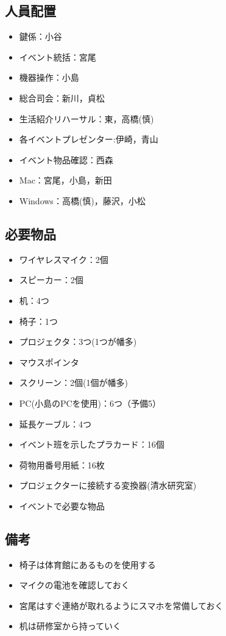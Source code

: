 \subsection{人員配置}
\begin{itemize}
\item 鍵係：小谷
\item イベント統括：宮尾
\item 機器操作：小島
\item 総合司会：新川，貞松
\item 生活紹介リハーサル：東，高橋(慎)
\item 各イベントプレゼンター:伊崎，青山
\item イベント物品確認：西森
\item Mac：宮尾，小島，新田
\item Windows：高橋(慎)，藤沢，小松
\end{itemize}




\subsection{必要物品}
\begin{itemize}
\item ワイヤレスマイク：2個
\item スピーカー：2個
\item 机：4つ
\item 椅子：1つ
\item プロジェクタ：3つ(1つが幡多)
\item マウスポインタ
\item スクリーン：2個(1個が幡多)
\item PC(小島のPCを使用)：6つ（予備5）
\item 延長ケーブル：4つ
\item イベント班を示したプラカード：16個
\item 荷物用番号用紙：16枚
\item プロジェクターに接続する変換器(清水研究室)
\item イベントで必要な物品
\end{itemize}

\subsection{備考}
\begin{itemize}
\item 椅子は体育館にあるものを使用する
\item マイクの電池を確認しておく
\item 宮尾はすぐ連絡が取れるようにスマホを常備しておく
\item 机は研修室から持っていく
\end{itemize}

%

